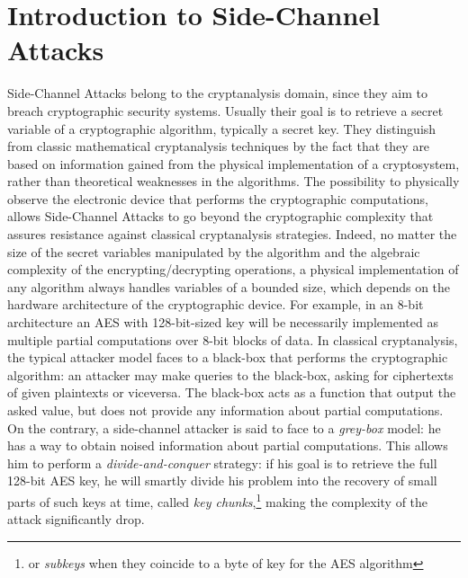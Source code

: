 \section{Introduction to Side-Channel Attacks}
Side-Channel Attacks belong to the cryptanalysis domain, since they aim to breach cryptographic security systems. Usually their goal is to retrieve a secret variable of a cryptographic algorithm, typically a secret key. They distinguish from classic mathematical cryptanalysis techniques by the fact that they are based on information gained from the physical implementation of a cryptosystem, rather than theoretical weaknesses in the algorithms. 
The possibility to physically observe the electronic device that performs the cryptographic computations, allows Side-Channel Attacks to go beyond the cryptographic complexity that assures resistance against classical cryptanalysis strategies.  Indeed, no matter the size of the secret variables manipulated by the algorithm and the algebraic complexity of the encrypting/decrypting operations, a physical implementation of any algorithm always handles variables of a bounded size, which depends on the hardware architecture of the cryptographic device. For example, in an 8-bit architecture an AES with 128-bit-sized key will be necessarily implemented as multiple partial computations over 8-bit blocks of data. In classical cryptanalysis, the typical attacker model faces to a black-box that performs the cryptographic algorithm: an attacker may make queries to the black-box, asking for ciphertexts of given plaintexts or viceversa. The black-box acts as a function that output the asked value, but does not provide any information about partial computations. On the contrary, a side-channel attacker is said to face to a \emph{grey-box} model: he has a way to obtain noised information about partial computations. This allows him to perform a \emph{divide-and-conquer} strategy: if his goal is to retrieve the full 128-bit AES key, he will smartly divide his problem into the recovery of small parts of such keys at time, called \emph{key chunks},\footnote{or \emph{subkeys} when they coincide to a byte of key for the AES algorithm} making the complexity of the attack significantly drop. 

